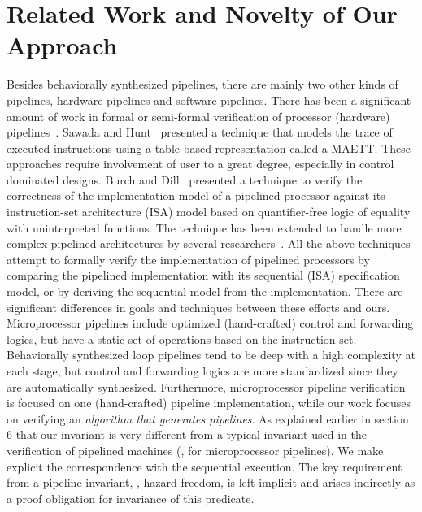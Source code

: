 \section{Related Work and Novelty of Our Approach}
\label{sec:related-work}

Besides behaviorally synthesized pipelines, there are mainly two other kinds of pipelines, hardware pipelines and software pipelines. 
There has been a significant amount of work in formal or semi-formal verification of processor (hardware) pipelines~\cite{pvs,Cyrluk94}. 
Sawada and Hunt~\cite{sh:pipeline} presented a technique that models the trace of executed 
instructions using a table-based representation called a MAETT. These approaches require involvement 
of user to a great degree, especially in control dominated designs. Burch and Dill~\cite{bd:pipeline} presented a technique to verify the 
correctness of the implementation model of a pipelined processor 
against its instruction-set architecture (ISA) model based on 
quantifier-free logic of equality with uninterpreted functions. 
The technique has been extended to handle more complex pipelined
architectures by several researchers~\cite{Velev2000,VelevBryant2000,pm:pipelines,velev05,sud-2010}. 
All the above techniques attempt to formally verify the implementation of
pipelined processors by comparing the pipelined implementation with its sequential
(ISA) specification model, or by deriving the sequential model from
the implementation. There are significant differences in goals
and techniques between these efforts and ours.
Microprocessor pipelines include optimized (hand-crafted)
control and forwarding logics, but have a static set of
operations based on the instruction set. Behaviorally synthesized 
loop pipelines tend to be deep with a high complexity at each stage, but
control and forwarding logics are more standardized since
they are automatically synthesized. 
Furthermore, microprocessor pipeline verification
is focused on one (hand-crafted) pipeline implementation,
while our work focuses on verifying an {\em algorithm
that generates pipelines}. As explained earlier in section 6  that our invariant is very different from a typical invariant
used in the verification of pipelined machines (\eg, for
microprocessor pipelines). We make explicit the
correspondence with the sequential execution. The key
requirement from a pipeline invariant, \viz, hazard freedom,
is left implicit and arises indirectly as a proof obligation
for invariance of this predicate. 
 
